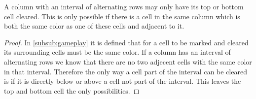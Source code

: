 \begin{lem}
\label{lem:alternatingrows}
A column with an interval of alternating rows may only have its top or bottom cell cleared. This is only possible if there is a cell in the same column which is both the same color as one of these cells and adjacent to it.
\end{lem}

\begin{proof}
In \ref{subsub:gameplay} it is defined that for a cell to be marked and cleared its surrounding cells must be the same color. If a column has an interval of alternating rows we know that there are no two adjecent cells with the same color in that interval. Therefore the only way a cell part of the interval can be cleared is if it is directly below or above a cell not part of the interval. This leaves the top and bottom cell the only possibilities.
\end{proof}
